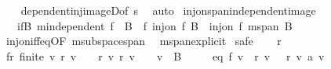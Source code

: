 \begin{isabellebody}
%
\isadelimproof
\ \ %
\endisadelimproof
%
\isatagproof
{}\isamarkupfalse%
\ dependent{\isacharunderscore}{\kern0pt}inj{\isacharunderscore}{\kern0pt}imageD{\isacharbrackleft}{\kern0pt}of\ s{\isacharbrackright}{\kern0pt}\ \isamarkupfalse%
\ auto%
\endisatagproof
{\isafoldproof}%
%
\isadelimproof
\isanewline
%
\endisadelimproof
\isanewline
{}\isamarkupfalse%
\ inj{\isacharunderscore}{\kern0pt}on{\isacharunderscore}{\kern0pt}span{\isacharunderscore}{\kern0pt}independent{\isacharunderscore}{\kern0pt}image{\isacharcolon}{\kern0pt}\isanewline
\ \ \ ifB{\isacharcolon}{\kern0pt}\ {\isachardoublequoteopen}m{}{\isachardot}{\kern0pt}independent\ {\isacharparenleft}{\kern0pt}f\ {\isacharbackquote}{\kern0pt}\ B{\isacharparenright}{\kern0pt}{\isachardoublequoteclose}\ \ f{\isacharcolon}{\kern0pt}\ {\isachardoublequoteopen}inj{\isacharunderscore}{\kern0pt}on\ f\ B{\isachardoublequoteclose}\ \ {\isachardoublequoteopen}inj{\isacharunderscore}{\kern0pt}on\ f\ {\isacharparenleft}{\kern0pt}m{}{\isachardot}{\kern0pt}span\ B{\isacharparenright}{\kern0pt}{\isachardoublequoteclose}\isanewline
%
\isadelimproof
\ \ %
\endisadelimproof
%
\isatagproof
{}\isamarkupfalse%
\ inj{\isacharunderscore}{\kern0pt}on{\isacharunderscore}{\kern0pt}iff{\isacharunderscore}{\kern0pt}eq{\isacharunderscore}{\kern0pt}{}{\isacharbrackleft}{\kern0pt}OF\ m{}{\isachardot}{\kern0pt}subspace{\isacharunderscore}{\kern0pt}span{\isacharbrackright}{\kern0pt}\ \isamarkupfalse%
\ m{}{\isachardot}{\kern0pt}span{\isacharunderscore}{\kern0pt}explicit{\isacharprime}{\kern0pt}\isanewline
{}\isamarkupfalse%
\ safe\isanewline
\ \ \isamarkupfalse%
\ r\ \isamarkupfalse%
\ fr{\isacharcolon}{\kern0pt}\ {\isachardoublequoteopen}finite\ {\isacharbraceleft}{\kern0pt}v{\isachardot}{\kern0pt}\ r\ v\ {\isasymnoteq}\ {}{\isacharbraceright}{\kern0pt}{\isachardoublequoteclose}\ \ r{\isacharcolon}{\kern0pt}\ {\isachardoublequoteopen}{\isasymforall}v{\isachardot}{\kern0pt}\ r\ v\ {\isasymnoteq}\ {}\ {\isasymlongrightarrow}\ v\ {\isasymin}\ B{\isachardoublequoteclose}\isanewline
\ \ \ \ \ eq{}{\isacharcolon}{\kern0pt}\ {\isachardoublequoteopen}f\ {\isacharparenleft}{\kern0pt}{\isasymSum}v\ {\isacharbar}{\kern0pt}\ r\ v\ {\isasymnoteq}\ {}{\isachardot}{\kern0pt}\ r\ v\ {\isacharasterisk}{\kern0pt}a\ v{\isacharparenright}{\kern0pt}\ {\isacharequal}{\kern0pt}\ {}{\isachardoublequoteclose}\isanewline

\end{isabellebody}
